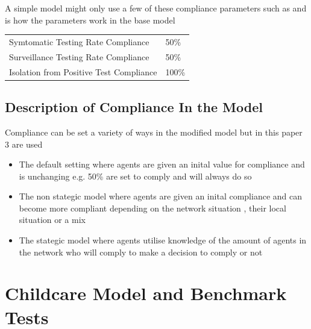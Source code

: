 \documentclass{article}
\begin{document}
A simple model might only use a few of these compliance parameters such as  and is how the parameters work in the base model

\begin{table}[h!]
\begin{tabular}{ll}
Symtomatic Testing Rate Compliance & 50\% \\
Surveillance Testing Rate Compliance & 50\% \\
Isolation from Positive Test Compliance & 100\%
\end{tabular}
\end{table}


\subsection{Description of Compliance In the Model}
Compliance can be set a variety of ways in the modified model but in this paper 3 are used
\begin{itemize}
\item The default setting where agents are given an inital value for compliance and is unchanging e.g. 50\% are set to comply and will always do so
\item The non stategic model where agents are given an inital compliance and can become more compliant depending on the network situation , their local situation or a mix
\item The stategic model where agents utilise knowledge of the amount of agents in the network who will comply to make a decision to comply or not
\end{itemize}



\section{Childcare Model and Benchmark Tests}
\end{document}
